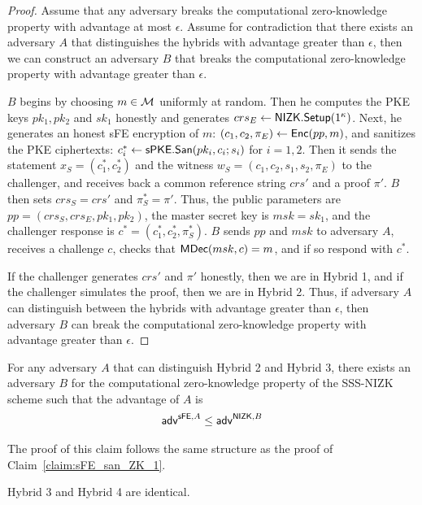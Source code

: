 \documentclass{llncs}
\begin{document}
\begin{proof} 
Assume that any adversary breaks the computational zero-knowledge property with advantage at most $\epsilon$. Assume for contradiction that there exists an adversary $A$ that distinguishes the hybrids with advantage greater than $\epsilon$, then we can construct an adversary $B$ that breaks the computational zero-knowledge property with advantage greater than $\epsilon$.

$B$ begins by choosing $m \in \mathcal{M}$ uniformly at random. Then he computes the PKE keys $pk_1,pk_2$ and $sk_1$ honestly and generates $crs_E \leftarrow \mathsf{NIZK}.\mathsf{Setup}(1^\kappa)$. Next, he generates an honest sFE encryption of $m$: $(c_1,c_2,\pi_E) \leftarrow \mathsf{Enc}(pp,m)$, and sanitizes the PKE ciphertexts: $c^*_i \leftarrow \mathsf{sPKE}.\mathsf{San}(pk_i,c_i;s_i)$ for $i=1,2$. 
Then it sends the statement $x_S = (c^*_1,c^*_2)$ and the witness $w_S = (c_1,c_2,s_1,s_2,\pi_E)$ to the challenger, and receives back a common reference string $crs'$ and a proof $\pi'$. 
$B$ then sets $crs_S = crs'$ and $\pi_S^* = \pi'$. Thus, the public parameters are $pp = (crs_S,crs_E,pk_1,pk_2)$, the master secret key is $msk=sk_1$, and the challenger response is $c^* = (c^*_1,c^*_2,\pi_S^*)$. 
$B$ sends $pp$ and $msk$ to adversary $A$, receives a challenge $c$, checks that $\mathsf{MDec}(msk,c) = m$, and if so respond with $c^*$. 

If the challenger generates $crs'$ and $\pi'$ honestly, then we are in Hybrid 1, and if the challenger simulates the proof, then we are in Hybrid 2. 
Thus, if adversary $A$ can distinguish between the hybrids with advantage greater than $\epsilon$, then adversary $B$ can break the computational zero-knowledge property with advantage greater than $\epsilon$.
\end{proof}


\begin{claim} \label{claim:sFE_san_ZK_2}
For any adversary $A$ that can distinguish Hybrid 2 and Hybrid 3, there exists an adversary $B$ for the computational zero-knowledge property of the SSS-NIZK scheme such that the advantage of $A$ is 
\begin{align*}
	\mathsf{adv}^{\mathsf{sFE},A} \leq \mathsf{adv}^{\mathsf{NIZK},B} 
\end{align*}
\end{claim}

The proof of this claim follows the same structure as the proof of Claim~\ref{claim:sFE_san_ZK_1}. 

\begin{claim} \label{claim:sFE_san_identical}
Hybrid 3 and Hybrid 4 are identical. 
\end{claim}
\end{document}
